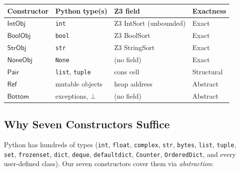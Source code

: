 \begin{center}
\begin{tabular}{l l l l}
  \textbf{Constructor} & \textbf{Python type(s)} & \textbf{Z3 field} &
  \textbf{Exactness} \\
  \hline
  $\mathsf{IntObj}$ & \texttt{int} & Z3 IntSort (unbounded) & Exact \\
  $\mathsf{BoolObj}$ & \texttt{bool} & Z3 BoolSort & Exact \\
  $\mathsf{StrObj}$ & \texttt{str} & Z3 StringSort & Exact \\
  $\mathsf{NoneObj}$ & \texttt{None} & (no field) & Exact \\
  $\mathsf{Pair}$ & \texttt{list}, \texttt{tuple} & cons cell & Structural \\
  $\mathsf{Ref}$ & mutable objects & heap address & Abstract \\
  $\mathsf{Bottom}$ & exceptions, $\bot$ & (no field) & Abstract \\
\end{tabular}
\end{center}

\subsection{Why Seven Constructors Suffice}

Python has hundreds of types (\texttt{int}, \texttt{float},
\texttt{complex}, \texttt{str}, \texttt{bytes}, \texttt{list},
\texttt{tuple}, \texttt{set}, \texttt{frozenset}, \texttt{dict},
\texttt{deque}, \texttt{defaultdict}, \texttt{Counter},
\texttt{OrderedDict}, and every user-defined class).  Our seven
constructors cover them via \emph{abstraction}:


